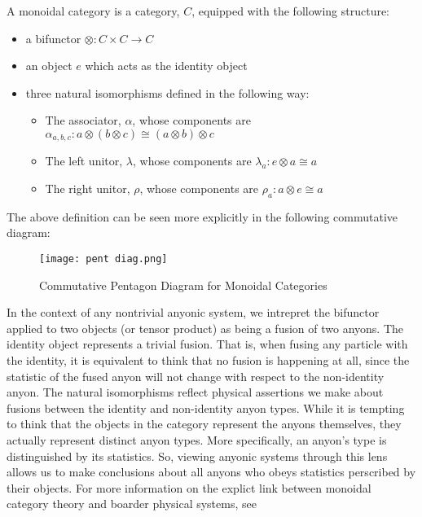 \begin{definition}
	A monoidal category is a category, $C$, equipped with the following structure:
\begin{itemize}
	\item a bifunctor $\otimes:C\times C\rightarrow C$
	\item an object $e$ which acts as the identity object
	\item three natural isomorphisms defined in the following way:
		\begin{itemize}
			\item The associator, $\alpha$, whose components are $\alpha_{a,b,c}: a\otimes(b\otimes c) \cong (a\otimes b)\otimes c$
			\item The left unitor, $\lambda$, whose components are $\lambda_a : e\otimes a \cong a$
			\item The right unitor, $\rho$, whose components are $\rho_a:a\otimes e \cong a$
		\end{itemize}
\end{itemize}
\end{definition}

The above definition can be seen more explicitly in the following commutative diagram:


\begin{figure}[H]
	\centering
	\texttt{[image: pent diag.png]}
	\caption{Commutative Pentagon Diagram for Monoidal Categories}
\end{figure}


In the context of any nontrivial anyonic system, we intrepret the bifunctor applied to two objects (or tensor product) as being a fusion of two anyons. The identity object represents a trivial fusion. That is, when fusing any particle with the identity, it is equivalent to think that no fusion is happening at all, since the statistic of the fused anyon will not change with respect to the non-identity anyon. The natural isomorphisms reflect physical assertions we make about fusions between the identity and non-identity anyon types. While it is tempting to think that the objects in the category represent the anyons themselves, they actually represent distinct anyon types. More specifically, an anyon's type is distinguished by its statistics. So, viewing anyonic systems through this lens allows us to make conclusions about all anyons who obeys statistics perscribed by their objects. For more information on the explict link between monoidal category theory and boarder physical systems, see \cite{Rose3}


